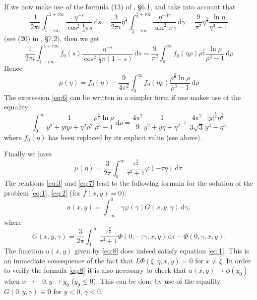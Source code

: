 \documentclass[a4paper,12pt]{article}
\newcommand{\dd}{\,\mathrm{d}}
\begin{document}
If we now make use of the formula (13) of \cite{zbMATH03088518}, \S 6.1, and take into account that
$$
\frac{1}{2 \pi i} \int_{1-i \infty}^{1+i \infty} \frac{\eta^{-s}}{\cos ^{2} \frac{1}{3} \pi s} \dd s=\frac{3}{2 \pi i} \eta^{\frac{3}{2}} \int_{\frac{5}{6}-i\infty}^{\frac{5}{6} +i \infty} \frac{\eta^{-3 \gamma}}{\sin ^{2} \pi \gamma} \dd \gamma=\frac{9}{\pi^{2}} \eta^{\frac{3}{2}} \frac{\ln \eta}{\eta^{3}-1}
$$
(see (20) in \cite{zbMATH03088518}, \S 7.2), then we get
$$
\frac{1}{2 \pi i} \int_{1-i\infty}^{1+i \infty} f_{0}(s) \frac{\eta^{-s}}{\cos ^{2} \frac{1}{3} \pi(1-s)} \dd s=\frac{9}{\pi^{2}} \int_{0}^{\infty} f_{0}(\eta \rho) \rho^{\frac{3}{2}} \frac{\ln \rho}{\rho^{3}-1} \dd \rho
$$
Hence
\begin{equation}
	\label{eq:6}
	\mu(\eta)=f_{0}(\eta)-\frac{9}{4\pi^{2}} \int_{0}^{\infty} f_{0}(\eta \rho) \frac{\rho^{\frac{3}{2}} \ln \rho}{\rho^{3}-1} \dd \rho
\end{equation}
The expression \eqref{eq:6} can be written in a simpler form if one makes use of the equality 
$$
\int_0^{\infty} \frac{1}{y^2 + y \eta \rho + \eta^2 \rho^2}
\frac{\rho^{\frac{3}{2}} \ln \rho}{\rho^{3}-1} \dd \rho
= 
\frac{4 \pi^2}{9} \frac{1}{y^2 + y \eta + \eta^2}
+ \frac{4\pi^2}{3 \sqrt{3}} \frac{|y|^{\frac{1}{2}} \eta^{\frac{1}{2}}}{y^3-\eta^3}
$$
where $f_{0}(\eta)$ has been replaced by its explicit value (see above).

Finally we have
\begin{equation}
	\label{eq:7}\mu(\eta)=\frac{3}{2 \pi} \int_{0}^{\infty} \frac{\tau^{\frac{3}{2}}}{\tau^{3}+1} \varphi(-\tau \eta) \dd \tau .
\end{equation}
The relations \eqref{eq:3} and \eqref{eq:7} lead to the following formula for the solution of the problem \eqref{eq:1}, \eqref{eq:2} (for $f(x, y)=0$):
\begin{equation}
	\label{eq:8}
	u(x, y)=\int_{-\infty}^{0} \gamma \varphi(\gamma) G(x, y, \gamma) \dd \gamma,
\end{equation}
where
\begin{equation}
	\label{eq:9}
	G(x, y, \gamma)=\frac{3}{2 \pi} \int_{0}^{\infty} \frac{\tau^{\frac{3}{2}}}{\tau^{3}+1} \Phi(0,-\tau \gamma, x, y) \dd \tau-\Phi(0, \gamma, x, y).
\end{equation}
The function $u(x, y)$ given by \eqref{eq:8} does indeed satisfy equation \eqref{eq:1}. This is an immediate consequence of the fact that $L \Phi(\xi, \eta, x, y)=0$ for $x \neq \xi$. In order to verify the formula \eqref{eq:8} it is also necessary to check that $u(x, y) \rightarrow \phi\left(y_{0}\right)$ when $x \rightarrow-0, y \rightarrow y_{0}$ ($y_{0} \leq 0$). This can be done by use of the equality $G(0, y, \gamma) \equiv 0$ for $y<0$, $\gamma<0$.
\end{document}
